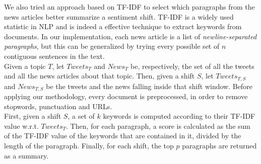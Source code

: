 We also tried an approach based on TF-IDF to select which paragraphs from the news articles better summarize a sentiment shift. TF-IDF is a widely used statistic in NLP and is indeed a effective technique to extract keywords from documents. In our implementation, each news article is a list of \emph{newline-separated paragraphs}, but this can be generalized by trying every possible set of $n$ contiguous sentences in the text.
\\
Given a topic $T$, let $Tweets_T$ and $News_T$ be, respectively, the set of all the tweets and all the news articles about that topic. Then, given a shift $S$, let $Tweets_{T,S}$ and $News_{T,S}$ be the tweets and the news falling inside that shift window. Before applying our methodology, every document is preprocessed, in order to remove stopwords, punctuation and URLs.
\\
First, given a shift $S$, a set of $k$ keywords is computed according to their TF-IDF value w.r.t. $Tweets_T$. Then, for each paragraph, a score is calculated as the sum of the TF-IDF value of the keywords that are contained in it, divided by the length of the paragraph. Finally, for each shift, the top $p$ paragraphs are returned as a summary.
\\\\

